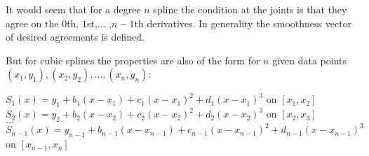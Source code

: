 It would seem that for a degree $n$ spline the condition at the joints is that they agree on the $0$th, $1$st,... ,$n-1$th derivatives. In generality the smoothness vector of desired agreements is defined.

But for cubic splines the properties are also of the form for $n$ given data points $(x_1,y_1),(x_2,y_2),\dots,(x_n,y_n)$:

$S_1(x)=y_1+b_1(x-x_1)+c_1(x-x_1)^2+d_1 (x-x_1)^3$ on $[x_1,x_2]$ \\
$S_2(x)=y_2+b_2(x-x_2)+c_2(x-x_2)^2+d_2 (x-x_2)^3$ on $[x_2,x_3]$ \\
$\dots $ \\
$S_{n-1}(x)=y_{n-1}+b_{n-1}(x-x_{n-1})+c_{n-1}(x-x_{n-1})^2+d_{n-1}(x-x_{n-1})^3$ on $[x_{n-1},x_n]$